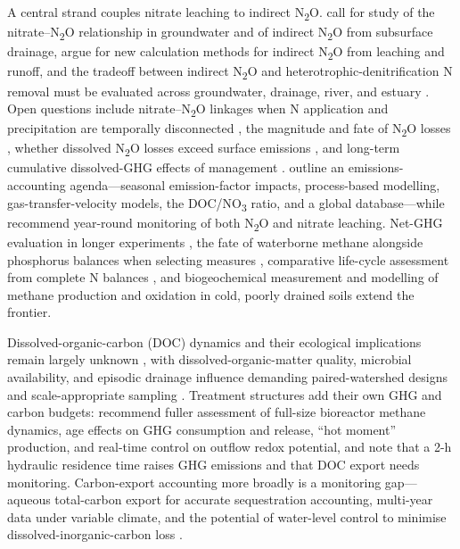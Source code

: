 A central strand couples nitrate leaching to indirect N\textsubscript{2}O.
\textcite{Sawamoto2003} call for study of the nitrate--N\textsubscript{2}O
relationship in groundwater and of indirect N\textsubscript{2}O from subsurface
drainage, \textcite{Minamikawa2015} argue for new calculation methods for
indirect N\textsubscript{2}O from leaching and runoff, and the tradeoff between
indirect N\textsubscript{2}O and heterotrophic-denitrification N removal must be
evaluated across groundwater, drainage, river, and estuary
\parencite{Minamikawa2013,Minamikawa2010}. Open questions include
nitrate--N\textsubscript{2}O linkages when N application and precipitation are
temporally disconnected \parencite{OBrien2022}, the magnitude and fate of
N\textsubscript{2}O losses \parencite{Burton2024}, whether dissolved
N\textsubscript{2}O losses exceed surface emissions \parencite{Smith2019}, and
long-term cumulative dissolved-GHG effects of management \parencite{Oliveira2025}.
\textcite{Webb2021} outline an emissions-accounting agenda---seasonal
emission-factor impacts, process-based modelling, gas-transfer-velocity models,
the DOC/NO\textsubscript{3} ratio, and a global database---while
\textcite{Fontes2019} recommend year-round monitoring of both N\textsubscript{2}O
and nitrate leaching. Net-GHG evaluation in longer experiments
\parencite{PrezaFontes2023}, the fate of waterborne methane alongside phosphorus
balances when selecting measures \parencite{Carstensen2021}, comparative
life-cycle assessment from complete N balances \parencite{HernandezRamirez2011},
and biogeochemical measurement and modelling of methane production and oxidation
in cold, poorly drained soils \parencite{Kumar2014b} extend the frontier.

Dissolved-organic-carbon (DOC) dynamics and their ecological implications remain
largely unknown \parencite{Ruark2009,Furukawa2008}, with dissolved-organic-matter
quality, microbial availability, and episodic drainage influence demanding
paired-watershed designs and scale-appropriate sampling
\parencite{Dalzell2011,Bellmore2015}. Treatment structures add their own GHG and
carbon budgets: \textcite{Brunton2024} recommend fuller assessment of full-size
bioreactor methane dynamics, age effects on GHG consumption and release,
``hot moment'' production, and real-time control on outflow redox potential, and
\textcite{Strock2025} note that a 2-h hydraulic residence time raises GHG
emissions and that DOC export needs monitoring. Carbon-export accounting more
broadly is a monitoring gap---aqueous total-carbon export for accurate
sequestration accounting, multi-year data under variable climate, and the
potential of water-level control to minimise dissolved-inorganic-carbon loss
\parencite{Schilling2023}.

